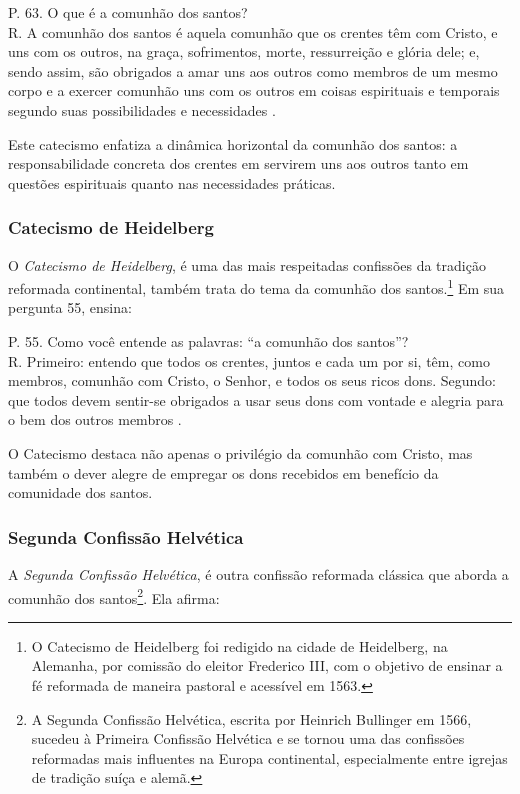 \begin{citacao}
    P. 63. O que é a comunhão dos santos?\\
    R. A comunhão dos santos é aquela comunhão que os crentes têm com Cristo, e uns com os outros, na graça, sofrimentos, morte, ressurreição e glória dele; e, sendo assim, são obrigados a amar uns aos outros como membros de um mesmo corpo e a exercer comunhão uns com os outros em coisas espirituais e temporais segundo suas possibilidades e necessidades \cite{catecismoMaior}.
\end{citacao}

Este catecismo enfatiza a dinâmica horizontal da comunhão dos santos: a responsabilidade concreta dos crentes em servirem uns aos outros tanto em questões espirituais quanto nas necessidades práticas.

\subsubsection{Catecismo de Heidelberg}
O \textit{Catecismo de Heidelberg}, é uma das mais respeitadas confissões da tradição reformada continental, também trata do tema da comunhão dos santos.\footnote{O Catecismo de Heidelberg foi redigido na cidade de Heidelberg, na Alemanha, por comissão do eleitor Frederico III, com o objetivo de ensinar a fé reformada de maneira pastoral e acessível em 1563.} Em sua pergunta 55, ensina:

\begin{citacao}
    P. 55. Como você entende as palavras: ``a comunhão dos santos''?\\
    R. Primeiro: entendo que todos os crentes, juntos e cada um por si, têm, como membros, comunhão com Cristo, o Senhor, e todos os seus ricos dons. Segundo: que todos devem sentir-se obrigados a usar seus dons com vontade e alegria para o bem dos outros membros \cite{heidelberg}.
\end{citacao}

O Catecismo destaca não apenas o privilégio da comunhão com Cristo, mas também o dever alegre de empregar os dons recebidos em benefício da comunidade dos santos.

\subsubsection{Segunda Confissão Helvética}
A \textit{Segunda Confissão Helvética}, é outra confissão reformada clássica que aborda a comunhão dos santos\footnote{A Segunda Confissão Helvética, escrita por Heinrich Bullinger em 1566, sucedeu à Primeira Confissão Helvética e se tornou uma das confissões reformadas mais influentes na Europa continental, especialmente entre igrejas de tradição suíça e alemã.}. Ela afirma:

